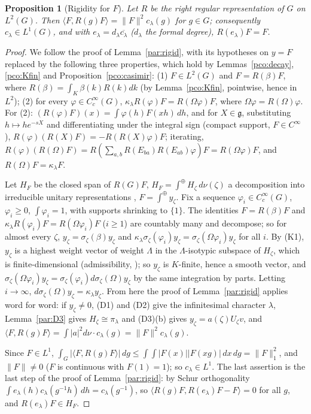 \documentclass[10pt]{amsart}
\newtheorem{proposition}[theorem]{Proposition}
\theoremstyle{definition}
\theoremstyle{remark}
\begin{document}
\begin{proposition}[Rigidity for $F$]\label{pco:rigid}
Let $R$ be the right regular representation of $G$ on $L^2(G)$. Then $\langle F,R(g)F\rangle=
\|F\|^2c_\lambda(g)$ for $g\in G$; consequently $c_\lambda\in L^1(G)$, and with $e_\lambda=d_\lambda
\overline{c_\lambda}$ \textup($d_\lambda$ the formal degree\textup), $R(e_\lambda)F=F$.
\end{proposition}
\begin{proof}
We follow the proof of Lemma~\ref{par:rigid}, with its hypotheses on $y=F$ replaced by the
following three properties, which hold by Lemmas~\ref{pco:decay}, \ref{pco:Kfin} and
Proposition~\ref{pco:casimir}: (1) $F\in L^2(G)$ and $F=R(\beta)F$, where $R(\beta)=\int_K\beta(k)R(k)dk$
(by Lemma~\ref{pco:Kfin}, pointwise, hence in $L^2$); (2) for every $\varphi\in C_c^\infty(G)$,
$\kappa_\lambda R(\varphi)F=R(\Omega\varphi)F$, where $\Omega\varphi=R(\Omega)\varphi$. For (2):
$(R(\varphi)F)(x)=\int\varphi(h)F(xh)\,dh$, and for $X\in\mathfrak g$, substituting $h\mapsto he^{-sX}$
and differentiating under the integral sign (compact support, $F\in C^\infty$),
$R(\varphi)(R(X)F)=-R(R(X)\varphi)F$; iterating, $R(\varphi)(R(\Omega)F)=R(\sum_{a,b}R(E_{ba})R(E_{ab})
\varphi)F=R(\Omega\varphi)F$, and $R(\Omega)F=\kappa_\lambda F$.

Let $H_F$ be the closed span of $R(G)F$, $H_F=\int^\oplus H_\zeta\,d\nu(\zeta)$ a decomposition into
irreducible unitary representations \cite{Dixmier}, $F=\int^\oplus y_\zeta$. Fix a sequence
$\varphi_i\in C_c^\infty(G)$, $\varphi_i\ge0$, $\int\varphi_i=1$, with supports shrinking to $\{1\}$.
The identities $F=R(\beta)F$ and $\kappa_\lambda R(\varphi_i)F=R(\Omega\varphi_i)F$ ($i\ge1$) are
countably many and decompose; so for almost every $\zeta$, $y_\zeta=\sigma_\zeta(\beta)y_\zeta$ and
$\kappa_\lambda\sigma_\zeta(\varphi_i)y_\zeta=\sigma_\zeta(\Omega\varphi_i)y_\zeta$ for all $i$. By (K1),
$y_\zeta$ is a highest weight vector of weight $\Lambda$ in the $\Lambda$-isotypic subspace of
$H_\zeta$, which is finite-dimensional (admissibility, \cite[Theorem~8.1, p.~205]{Knapp}); so $y_\zeta$ is
$K$-finite, hence a smooth vector, and $\sigma_\zeta(\Omega\varphi_i)y_\zeta=\sigma_\zeta(\varphi_i)
d\sigma_\zeta(\Omega)y_\zeta$ by the same integration by parts. Letting $i\to\infty$,
$d\sigma_\zeta(\Omega)y_\zeta=\kappa_\lambda y_\zeta$. From here the proof of Lemma~\ref{par:rigid}
applies word for word: if $y_\zeta\ne0$, (D1) and (D2) give the infinitesimal character $\lambda$,
Lemma~\ref{par:D3} gives $H_\zeta\cong\pi_\lambda$ and (D3)(b) gives $y_\zeta=a(\zeta)U_\zeta v$, and $\langle F,R(g)F\rangle=
\int|a|^2d\nu\cdot c_\lambda(g)=\|F\|^2c_\lambda(g)$.

Since $F\in L^1$, $\int_G|\langle F,R(g)F\rangle|\,dg\le\int\!\!\int|F(x)||F(xg)|\,dx\,dg=\|F\|_1^2$,
and $\|F\|\ne0$ ($F$ is continuous with $F(1)=1$); so $c_\lambda\in L^1$. The last assertion is the
last step of the proof of Lemma~\ref{par:rigid}: by Schur orthogonality $\int e_\lambda(h)c_\lambda
(g^{-1}h)\,dh=c_\lambda(g^{-1})$, so $\langle R(g)F,R(e_\lambda)F-F\rangle=0$ for all $g$, and
$R(e_\lambda)F\in H_F$.
\end{proof}
\end{document}
